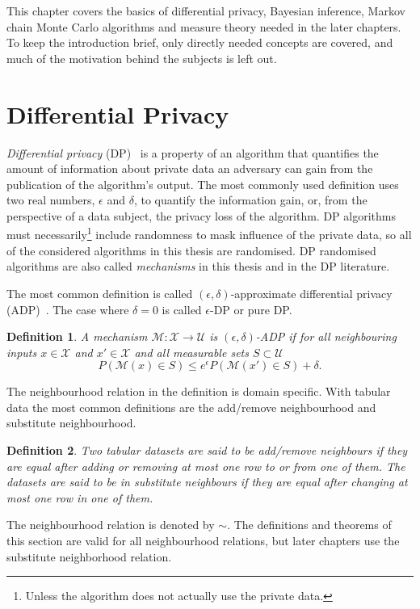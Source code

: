 \documentclass[english,twoside,openright]{HYgraduMLDS}
\newtheorem{definition}{Definition}
\newcommand{\calm}{{\mathcal{M}}}
\newcommand{\calx}{{\mathcal{X}}}
\newcommand{\calu}{{\mathcal{U}}}
\begin{document}
This chapter covers the basics of differential privacy, Bayesian inference,
Markov chain Monte Carlo algorithms and measure theory
needed in the later chapters. To keep
the introduction brief, only directly needed concepts are covered, and much
of the motivation behind the subjects is left out.

\section{Differential Privacy}\label{DP_background}
\emph{Differential privacy} (DP)~\cite{DMN06, DwR14} is a property of
an algorithm that quantifies the
amount of information about private data an adversary can gain from the 
publication of the algorithm's output.
The most commonly used definition uses two real numbers, 
\(\epsilon\) and \(\delta\), to quantify the information gain, or, from the 
perspective of a data subject, the privacy loss of the algorithm.
DP algorithms must necessarily\footnote{Unless the algorithm does not
actually use the private data.} include randomness to mask influence of the
private data, so all of the considered algorithms in this thesis are randomised.
DP randomised algorithms are also called \emph{mechanisms} in this thesis and in the
DP literature.

The most common definition is called \((\epsilon, \delta)\)-approximate
differential privacy (ADP)~\cite{DKM06, DwR14}.
The case where \(\delta = 0\) is called \(\epsilon\)-DP or 
pure DP.

\begin{definition}\label{ADP-definition}
    A mechanism \(\calm\colon \calx \to \calu\) is \((\epsilon, \delta)\)-ADP if
    for all neighbouring inputs \(x\in \calx\) and \(x'\in \calx\) and 
    all measurable sets \(S \subset \calu\)
    \[
        P(\calm(x)\in S) \leq e^\epsilon P(\calm(x')\in S) + \delta.
    \]
\end{definition}

The neighbourhood relation in the definition is domain specific. With tabular 
data the most common definitions are the add/remove neighbourhood and 
substitute neighbourhood.
\begin{definition}
    Two tabular datasets are said to be add/remove neighbours if they are equal 
    after adding or removing at most one row to or from one of them. The datasets 
    are said to be in substitute neighbours if they are equal after 
    changing at most one row in one of them.
\end{definition}
The neighbourhood relation is denoted by \(\sim\). The definitions and 
theorems of this section are valid for all neighbourhood relations, but later
chapters use the substitute neighborhood relation.
\end{document}
